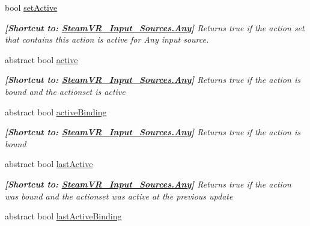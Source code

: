 \begin{DoxyCompactItemize}
bool \mbox{\hyperlink{class_valve_1_1_v_r_1_1_steam_v_r___action_ad92856584dc24071f25b610fe237e4ee}{set\+Active}}
\begin{DoxyCompactList}\small\item\em {\bfseries{\mbox{[}Shortcut to\+: \mbox{\hyperlink{namespace_valve_1_1_v_r_a82e5bf501cc3aa155444ee3f0662853faed36a1ef76a59ee3f15180e0441188ad}{Steam\+V\+R\+\_\+\+Input\+\_\+\+Sources.\+Any}}\mbox{]}}} Returns true if the action set that contains this action is active for Any input source. \end{DoxyCompactList}\item 
abstract bool \mbox{\hyperlink{class_valve_1_1_v_r_1_1_steam_v_r___action_a0fd56f7ca6074a8320738f50c8d43844}{active}}
\begin{DoxyCompactList}\small\item\em {\bfseries{\mbox{[}Shortcut to\+: \mbox{\hyperlink{namespace_valve_1_1_v_r_a82e5bf501cc3aa155444ee3f0662853faed36a1ef76a59ee3f15180e0441188ad}{Steam\+V\+R\+\_\+\+Input\+\_\+\+Sources.\+Any}}\mbox{]}}} Returns true if the action is bound and the actionset is active \end{DoxyCompactList}\item 
abstract bool \mbox{\hyperlink{class_valve_1_1_v_r_1_1_steam_v_r___action_a66107ca9c11bd18775b0e1bf794d3568}{active\+Binding}}
\begin{DoxyCompactList}\small\item\em {\bfseries{\mbox{[}Shortcut to\+: \mbox{\hyperlink{namespace_valve_1_1_v_r_a82e5bf501cc3aa155444ee3f0662853faed36a1ef76a59ee3f15180e0441188ad}{Steam\+V\+R\+\_\+\+Input\+\_\+\+Sources.\+Any}}\mbox{]}}} Returns true if the action is bound \end{DoxyCompactList}\item 
abstract bool \mbox{\hyperlink{class_valve_1_1_v_r_1_1_steam_v_r___action_a38ff81951fad828a51df2bdd1f3f50f6}{last\+Active}}
\begin{DoxyCompactList}\small\item\em {\bfseries{\mbox{[}Shortcut to\+: \mbox{\hyperlink{namespace_valve_1_1_v_r_a82e5bf501cc3aa155444ee3f0662853faed36a1ef76a59ee3f15180e0441188ad}{Steam\+V\+R\+\_\+\+Input\+\_\+\+Sources.\+Any}}\mbox{]}}} Returns true if the action was bound and the actionset was active at the previous update \end{DoxyCompactList}\item 
abstract bool \mbox{\hyperlink{class_valve_1_1_v_r_1_1_steam_v_r___action_a679b7a902fc8c53b9bf421c6e96bc26a}{last\+Active\+Binding}}
\end{DoxyCompactItemize}



